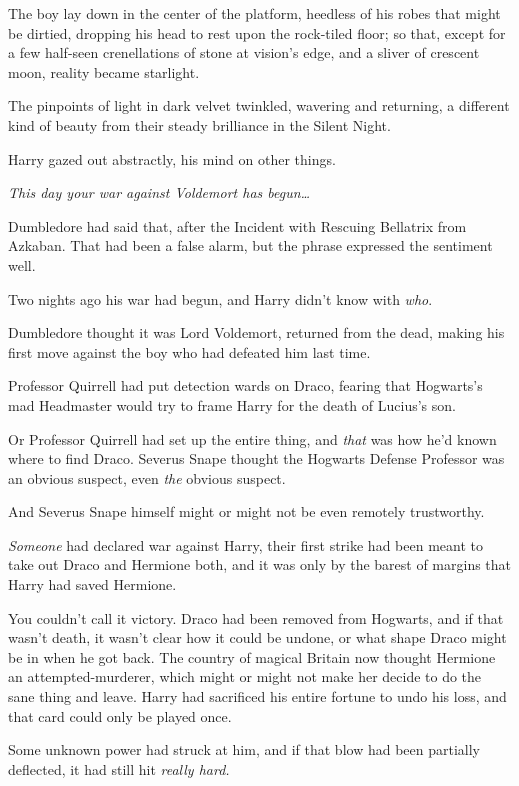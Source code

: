 The boy lay down in the center of the platform, heedless of his robes that 
might be dirtied, dropping his head to rest upon the rock-tiled floor; so that, 
except for a few half-seen crenellations of stone at vision's edge, and a 
sliver of crescent moon, reality became starlight.

The pinpoints of light in dark velvet twinkled, wavering and returning, a 
different kind of beauty from their steady brilliance in the Silent Night.

Harry gazed out abstractly, his mind on other things.

\emph{This day your war against Voldemort has begun{\ldots}}

Dumbledore had said that, after the Incident with Rescuing Bellatrix from 
Azkaban. That had been a false alarm, but the phrase expressed the sentiment 
well.

Two nights ago his war had begun, and Harry didn't know with \emph{who}.

Dumbledore thought it was Lord Voldemort, returned from the dead, making his 
first move against the boy who had defeated him last time.

Professor Quirrell had put detection wards on Draco, fearing that Hogwarts's 
mad Headmaster would try to frame Harry for the death of Lucius's son.

Or Professor Quirrell had set up the entire thing, and \emph{that} was how he'd 
known where to find Draco. Severus Snape thought the Hogwarts Defense Professor 
was an obvious suspect, even \emph{the} obvious suspect.

And Severus Snape himself might or might not be even remotely trustworthy.

\emph{Someone} had declared war against Harry, their first strike had been 
meant to take out Draco and Hermione both, and it was only by the barest of 
margins that Harry had saved Hermione.

You couldn't call it victory. Draco had been removed from Hogwarts, and if that 
wasn't death, it wasn't clear how it could be undone, or what shape Draco might 
be in when he got back. The country of magical Britain now thought Hermione an 
attempted-murderer, which might or might not make her decide to do the sane 
thing and leave. Harry had sacrificed his entire fortune to undo his loss, and 
that card could only be played once.

Some unknown power had struck at him, and if that blow had been partially 
deflected, it had still hit \emph{really hard.}

